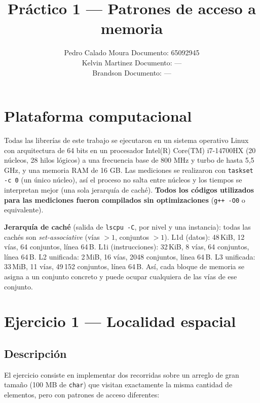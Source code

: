 \documentclass[11pt,a4paper]{article}
\title{Práctico 1 --- Patrones de acceso a memoria}
\author{%
  Pedro Calado Moura \quad Documento: 65092945\\
  Kelvin Martinez \quad Documento: ---\\
  Brandson \quad Documento: ---%
}
\date{}
\begin{document}
\maketitle

\section*{Plataforma computacional}

Todas las librerías de este trabajo se ejecutaron en un sistema operativo Linux con arquitectura de 64 bits en un procesador Intel(R) Core(TM) i7-14700HX (20 núcleos, 28 hilos lógicos) a una frecuencia base de 800 MHz y turbo de hasta 5,5 GHz, y una memoria RAM de 16 GB. Las mediciones se realizaron con \texttt{taskset -c 0} (un único núcleo), así el proceso no salta entre núcleos y los tiempos se interpretan mejor (una sola jerarquía de caché). \textbf{Todos los códigos utilizados para las mediciones fueron compilados sin optimizaciones} (\texttt{g++ -O0} o equivalente).

\textbf{Jerarquía de caché} (salida de \texttt{lscpu -C}, por nivel y una instancia): todas las cachés son \textit{set-associative} (vías \(>1\), conjuntos \(>1\)). L1d (datos): 48\,KiB, 12 vías, 64 conjuntos, línea 64\,B. L1i (instrucciones): 32\,KiB, 8 vías, 64 conjuntos, línea 64\,B. L2 unificada: 2\,MiB, 16 vías, 2048 conjuntos, línea 64\,B. L3 unificada: 33\,MiB, 11 vías, 49\,152 conjuntos, línea 64\,B. Así, cada bloque de memoria se asigna a un conjunto concreto y puede ocupar cualquiera de las vías de ese conjunto.

\section*{Ejercicio 1 --- Localidad espacial}

\subsection*{Descripción}

El ejercicio consiste en implementar dos recorridas sobre un arreglo de gran tamaño (100 MB de \texttt{char}) que visitan exactamente la misma cantidad de elementos, pero con patrones de acceso diferentes:
\end{document}
